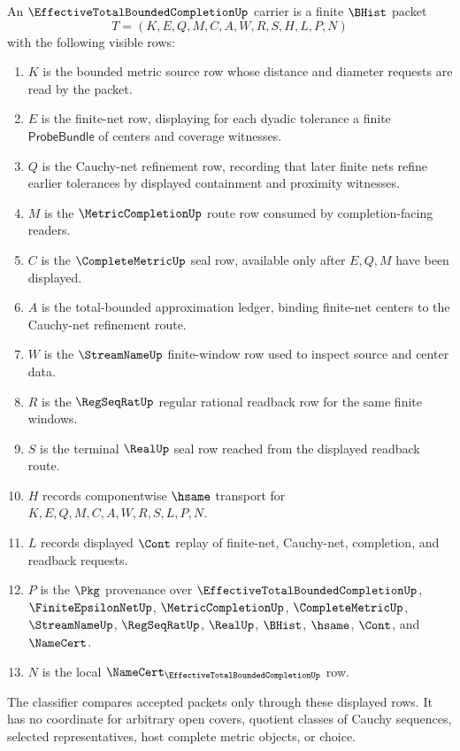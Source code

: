 \begin{definition}
\label{def:effective-total-bounded-completion-carrier}
An $\EffectiveTotalBoundedCompletionUp$ carrier is a finite $\BHist$ packet
$$
T=(K,E,Q,M,C,A,W,R,S,H,L,P,N)
$$
with the following visible rows:
\begin{enumerate}
\item $K$ is the bounded metric source row whose distance and diameter requests are read by the packet.
\item $E$ is the finite-net row, displaying for each dyadic tolerance a finite $\mathsf{ProbeBundle}$ of centers and coverage witnesses.
\item $Q$ is the Cauchy-net refinement row, recording that later finite nets refine earlier tolerances by displayed containment and proximity witnesses.
\item $M$ is the $\MetricCompletionUp$ route row consumed by completion-facing readers.
\item $C$ is the $\CompleteMetricUp$ seal row, available only after $E,Q,M$ have been displayed.
\item $A$ is the total-bounded approximation ledger, binding finite-net centers to the Cauchy-net refinement route.
\item $W$ is the $\StreamNameUp$ finite-window row used to inspect source and center data.
\item $R$ is the $\RegSeqRatUp$ regular rational readback row for the same finite windows.
\item $S$ is the terminal $\RealUp$ seal row reached from the displayed readback route.
\item $H$ records componentwise $\hsame$ transport for $K,E,Q,M,C,A,W,R,S,L,P,N$.
\item $L$ records displayed $\Cont$ replay of finite-net, Cauchy-net, completion, and readback requests.
\item $P$ is the $\Pkg$ provenance over $\EffectiveTotalBoundedCompletionUp$, $\FiniteEpsilonNetUp$, $\MetricCompletionUp$, $\CompleteMetricUp$, $\StreamNameUp$, $\RegSeqRatUp$, $\RealUp$, $\BHist$, $\hsame$, $\Cont$, and $\NameCert$.
\item $N$ is the local $\NameCert_{\EffectiveTotalBoundedCompletionUp}$ row.
\end{enumerate}
The classifier compares accepted packets only through these displayed rows. It has no coordinate for arbitrary open covers, quotient classes of Cauchy sequences, selected representatives, host complete metric objects, or choice.
\end{definition}

